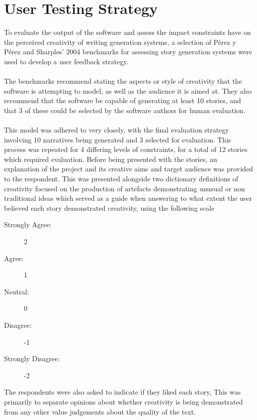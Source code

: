 \documentclass[letterpaper]{article}
\begin{document}
\section{User Testing Strategy}
To evaluate the output of the software and assess the impact constraints have on the perceived creativity of writing generation systems, a selection of P\'erez y P\'erez and Sharples' 2004 benchmarks for assessing story generation systems were used to develop a user feedback strategy.\\
\\The benchmarks recommend stating the aspects or style of creativity that the software is attempting to model, as well as the audience it is aimed at. They also recommend that the software be capable of generating at least 10 stories, and that 3 of these could be selected by the software authors for human evaluation.\\ 
\\This model was adhered to very closely, with the final evaluation strategy involving 10 narratives being generated and 3 selected for evaluation. This process was repeated for 4 differing levels of constraints, for a total of 12 stories which required evaluation. Before being presented with the stories, an explanation of the project and its creative aims and target audience was provided to the respondent. This was presented alongside two dictionary definitions of creativity focused on the production of artefacts demonstrating unusual or non traditional ideas which served as a guide when answering to what extent the user believed each story demonstrated creativity, using the following scale
\begin{description}
\item[Strongly Agree:] 2
\item[Agree:] 1
\item[Neutral:] 0
\item[Disagree:] -1
\item[Strongly Disagree:] -2
\end{description} 
The respondents were also asked to indicate if they liked each story, This was primarily to separate opinions about whether creativity is being demonstrated from any other value judgements about the quality of the text.
\end{document}
